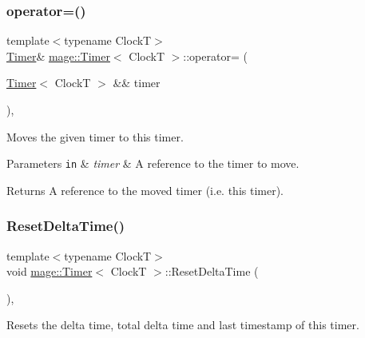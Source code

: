 \subsubsection{\texorpdfstring{operator=()}{operator=()}\hspace{0.1cm}{\footnotesize\ttfamily [2/2]}}
{\footnotesize\ttfamily template$<$typename ClockT$>$ \\
\mbox{\hyperlink{classmage_1_1_timer}{Timer}}\& \mbox{\hyperlink{classmage_1_1_timer}{mage\+::\+Timer}}$<$ ClockT $>$\+::operator= (\begin{DoxyParamCaption}\item[{\mbox{\hyperlink{classmage_1_1_timer}{Timer}}$<$ ClockT $>$ \&\&}]{timer }\end{DoxyParamCaption})\hspace{0.3cm}{\ttfamily [default]}, {\ttfamily [noexcept]}}

Moves the given timer to this timer.


\begin{DoxyParams}[1]{Parameters}
\mbox{\tt in}  & {\em timer} & A reference to the timer to move. \\
\hline
\end{DoxyParams}
\begin{DoxyReturn}{Returns}
A reference to the moved timer (i.\+e. this timer). 
\end{DoxyReturn}
\mbox{\label{classmage_1_1_timer_a9afe1eae8a5edbc4b15d7eefab417dc0}} 
\subsubsection{\texorpdfstring{Reset\+Delta\+Time()}{ResetDeltaTime()}}
{\footnotesize\ttfamily template$<$typename ClockT$>$ \\
void \mbox{\hyperlink{classmage_1_1_timer}{mage\+::\+Timer}}$<$ ClockT $>$\+::Reset\+Delta\+Time (\begin{DoxyParamCaption}{ }\end{DoxyParamCaption})\hspace{0.3cm}{\ttfamily [private]}, {\ttfamily [noexcept]}}

Resets the delta time, total delta time and last timestamp of this timer. \mbox{\label{classmage_1_1_timer_a54dab2d77f8beca30d52e8497e466988}} 
